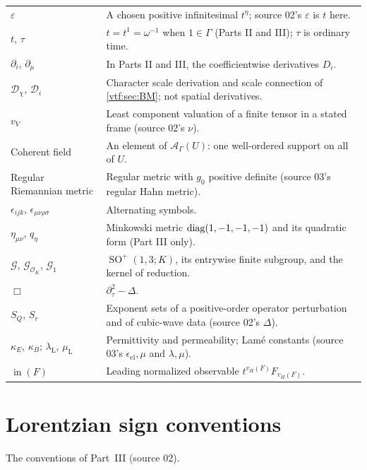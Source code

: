 \documentclass[11pt,letterpaper]{article}
\theoremstyle{definition}
\theoremstyle{remark}
\newcommand{\A}{\mathscr A}\newcommand{\OO}{\mathcal O}\newcommand{\mm}{\mathfrak m}
\newcommand{\SO}{\operatorname{SO}}\newcommand{\SL}{\operatorname{SL}}
\newcommand{\vH}{v_{\!H}}
\newcommand{\eps}{\varepsilon}
\begin{document}
\begin{longtable}{P{0.24\textwidth}P{0.68\textwidth}}
$\eps$ & A chosen positive infinitesimal $t^\eta$; source 02's $\eps$ is $t$ here.\\
$t$, $\tau$ & $t=t^1=\omega^{-1}$ when $1\in\Gamma$ (Parts II and III); $\tau$ is ordinary time.\\
$\partial_i$, $\partial_\mu$ & In Parts II and III, the coefficientwise derivatives $D_i$.\\
$\mathscr D_\chi$, $\mathcal D_i$ & Character scale derivation and scale connection of \cref{vtf:sec:BM}; not spatial derivatives.\\
$v_V$ & Least component valuation of a finite tensor in a stated frame (source 02's $\nu$).\\
Coherent field & An element of $\A_\Gamma(U)$: one well-ordered support on all of $U$.\\
Regular Riemannian metric & Regular metric with $g_0$ positive definite (source 03's regular Hahn metric).\\
$\epsilon_{ijk}$, $\epsilon_{\mu\nu\rho\sigma}$ & Alternating symbols.\\
$\eta_{\mu\nu}$, $q_\eta$ & Minkowski metric $\operatorname{diag}(1,-1,-1,-1)$ and its quadratic form (Part III only).\\
$\mathcal G$, $\mathcal G_{\OO_K}$, $\mathcal G_1$ & $\SO^+(1,3;K)$, its entrywise finite subgroup, and the kernel of reduction.\\
$\Box$ & $\partial_\tau^2-\Delta$.\\
$S_Q$, $S_r$ & Exponent sets of a positive-order operator perturbation and of cubic-wave data (source 02's $\Delta$).\\
$\kappa_E$, $\kappa_B$; $\lambda_{\mathrm L}$, $\mu_{\mathrm L}$ & Permittivity and permeability; Lam\'e constants (source 03's $\epsilon_{\mathrm{el}},\mu$ and $\lambda,\mu$).\\
$\operatorname{in}(F)$ & Leading normalized observable $t^{\vH(F)}F_{\vH(F)}$.\\
\bottomrule
\end{longtable}

\section{Lorentzian sign conventions}\label{vtf:app:lorentzconv}

The conventions of Part~III (source 02).
\end{document}
